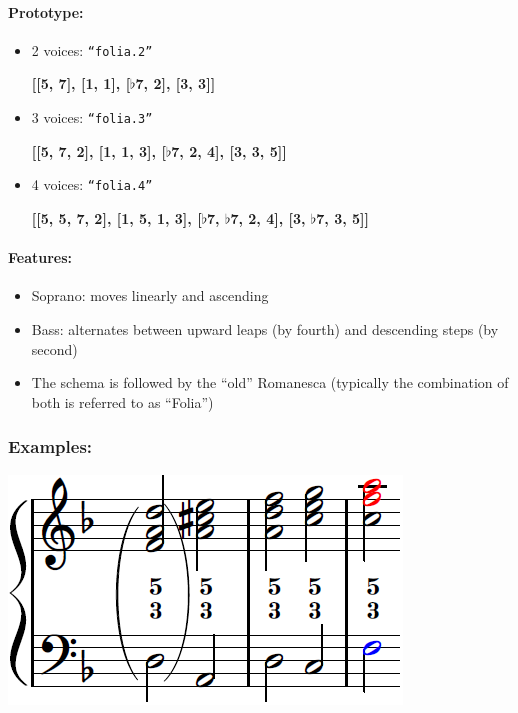 ﻿\documentclass[11pt, openany]{article}
\begin{document}
\paragraph{Prototype:}
\begin{itemize}
\item 2 voices: \texttt{“folia.2”}
	\begin{center}
	\textbf{[[5, 7], [1, 1], [$\flat$7, 2], [3, 3]]}
	\end{center}
\item 3 voices: \texttt{“folia.3”}
	\begin{center}
	\textbf{[[5, 7, 2], [1, 1, 3], [$\flat$7, 2, 4], [3, 3, 5]]}
	\end{center}
\item 4 voices: \texttt{“folia.4”}
	\begin{center}
	\textbf{[[5, 5, 7, 2], [1, 5, 1, 3], [$\flat$7, $\flat$7, 2, 4], [3, $\flat$7, 3, 5]]}
	\end{center}
\end{itemize}

\paragraph{Features:}
\begin{itemize}
\item Soprano: moves linearly and ascending
\item Bass: alternates between upward leaps (by fourth) and descending steps (by second)
\item The schema is followed by the “old” Romanesca (typically the combination of both is referred to as “Folia”)
\end{itemize}

\subsubsection{Examples:}
\begin{center}
\includegraphics[scale=0.8]{folia.png}
\end{center}
\end{document}
